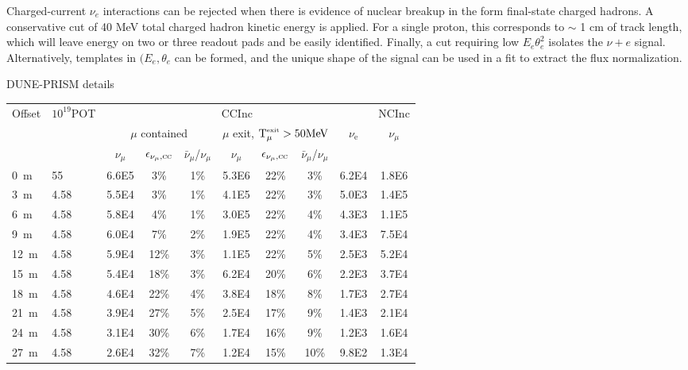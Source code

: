 Charged-current $\nu_{e}$ interactions can be rejected when there is evidence of nuclear breakup in the form final-state charged hadrons. A conservative cut of 40 MeV total charged hadron kinetic energy is applied. For a single proton, this corresponds to $\sim$ 1 cm of track length, which will leave energy on two or three readout pads and be easily identified. Finally, a cut requiring low $E_{e}\theta_{e}^{2}$ isolates the $\nu+e$ signal. Alternatively, templates in $(E_{e}, \theta_{e}$ can be formed, and the unique shape of the signal can be used in a fit to extract the flux normalization.

DUNE-PRISM details

\begin{table}
\begin{tabular}{ l l || c c | c || c c | c | c || c }
\multirow{3}{*}{Offset} & \multirow{3}{*}{$10^{19}$POT} & \multicolumn{7}{c||}{CCInc} & NCInc \\
\cline{3-10}
& & \multicolumn{3}{c||}{$\mu$ contained} & \multicolumn{3}{c|}{$\mu$ exit, $\textrm{T}_{\mu}^\textrm{\tiny exit} > 50 \textrm{MeV}$} & \multirow{2}{*}{$\nu_\textrm{e}$} & \multirow{2}{*}{$\nu_{\mu}$} \\
& & $\nu_{\mu}$ & $\epsilon_{\nu_{\mu},\textsc{cc}}$ & $\bar{\nu}_{\mu}$/$\nu_{\mu}$ & $\nu_{\mu}$ & $\epsilon_{\nu_{\mu},\textsc{cc}}$ & $\bar{\nu}_{\mu}$/$\nu_{\mu}$ & & \\ \hline
 0~m  &  55  & 6.6E5 & 3\% & 1\% & 5.3E6 & 22\% & 3\% & 6.2E4 & 1.8E6 \\
 3~m  &  4.58  & 5.5E4 & 3\% & 1\% & 4.1E5 & 22\% & 3\% & 5.0E3 & 1.4E5  \\
 6~m  &  4.58  & 5.8E4 & 4\% & 1\% & 3.0E5 & 22\% & 4\% & 4.3E3 & 1.1E5 \\
 9~m  &  4.58  & 6.0E4 & 7\% & 2\% & 1.9E5 & 22\% & 4\% & 3.4E3 & 7.5E4 \\
 12~m  &  4.58  & 5.9E4 & 12\% & 3\% & 1.1E5 & 22\% & 5\% & 2.5E3 & 5.2E4 \\
 15~m  &  4.58  & 5.4E4 & 18\% & 3\% & 6.2E4 & 20\% & 6\% & 2.2E3 & 3.7E4 \\
 18~m  &  4.58  & 4.6E4 & 22\% & 4\% & 3.8E4 & 18\% & 8\% & 1.7E3 & 2.7E4 \\
 21~m  &  4.58  & 3.9E4 & 27\% & 5\% & 2.5E4 & 17\% & 9\% & 1.4E3 & 2.1E4 \\
 24~m  &  4.58  & 3.1E4 & 30\% & 6\% & 1.7E4 & 16\% & 9\% & 1.2E3 & 1.6E4 \\
 27~m  &  4.58  & 2.6E4 & 32\% & 7\% & 1.2E4 & 15\% & 10\% & 9.8E2 & 1.3E4 \\

\end{tabular}
\end{table}
